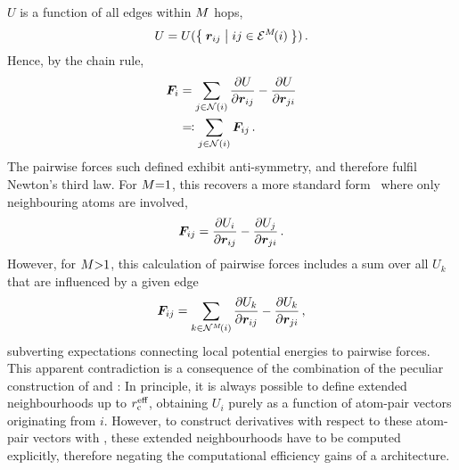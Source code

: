 $U$ is a function of all edges within $M$ hops,
\begin{equation}
    U = U(\Set{\boldsymbol{r}_{ij} | ij \in \mathcal{E}^M\!(i)}) \, .
\end{equation}
Hence, by the chain rule,
\begin{align}
    \boldsymbol{F}_i &= \sum_{j \in \mathcal{N}(i)} \frac{\partial U_{}}{\partial \boldsymbol{r}_{ij}} - \frac{\partial U_{}}{\partial \boldsymbol{r}_{ji}} \\
    &\eqqcolon \sum_{j \in \mathcal{N}(i)} \boldsymbol{F}_{ij} \, .
\end{align}
The pairwise forces such defined exhibit anti-symmetry, and therefore fulfil Newton's third law.
For $M{=}1$, this recovers a more standard form~\cite{fpdh2015t} where only neighbouring atoms are involved,
\begin{equation}
    \boldsymbol{F}_{ij} = \frac{\partial U_{i}}{\partial \boldsymbol{r}_{ij}} - \frac{\partial U_{j}}{\partial \boldsymbol{r}_{ji}} \, .
\end{equation}
However, for $M{>}1$, this calculation of pairwise forces includes a sum over all $U_k$ that are influenced by a given edge
\begin{equation}
    \boldsymbol{F}_{ij} = \sum_{k \in \mathcal{N}^M\!(i)} \frac{\partial U_{k}}{\partial \boldsymbol{r}_{ij}} - \frac{\partial U_{k}}{\partial \boldsymbol{r}_{ji}} \, ,
\end{equation}
subverting expectations connecting local potential energies to pairwise forces.
This apparent contradiction is a consequence of the combination of the peculiar construction of \glps and \ad: In principle, it is always possible to define extended neighbourhoods up to $r_{\text{c}}^{\text{eff}}$, obtaining $U_i$ purely as a function of atom-pair vectors originating from $i$.
However, to construct derivatives with respect to these atom-pair vectors with \ad, these extended neighbourhoods have to be computed explicitly, therefore negating the computational efficiency gains of a \glp architecture.

